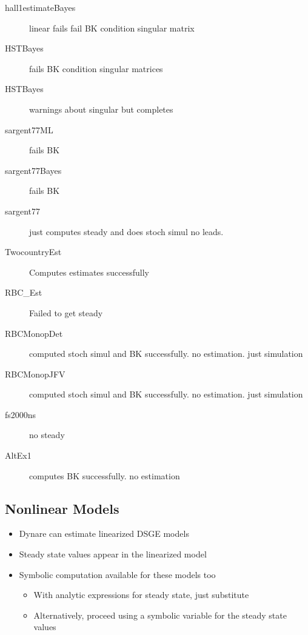 \documentclass[12pt]{article}
\begin{document}
\begin{description}
\item[hall1estimateBayes] linear fails fail BK condition   singular matrix
\item[HSTBayes] fails BK condition singular matrices  
\item[HSTBayes] warnings about singular but completes
\item[sargent77ML] fails BK
\item[sargent77Bayes] fails BK
\item[sargent77] just computes steady and does stoch simul  no leads.
\item[TwocountryEst] Computes estimates successfully
\item[RBC\_Est] Failed to get steady
\item[RBCMonopDet] computed stoch simul and BK successfully. no estimation. just simulation
\item[RBCMonopJFV] computed stoch simul and BK successfully. no estimation. just simulation
  \item[fs2000ns] no steady
  \item[AltEx1] computes BK successfully. no estimation
\end{description}

\vspace{1cm}


  \subsection{Nonlinear Models}
  \begin{itemize}
  \item Dynare can estimate linearized DSGE models
  \item Steady state values appear in the linearized model
  \item Symbolic computation available for these models too
      \begin{itemize}
      \item With analytic expressions for steady state, just substitute
      \item Alternatively, proceed using  a symbolic variable for the 
        steady state values
      \end{itemize}
  \end{itemize}
\end{document}
